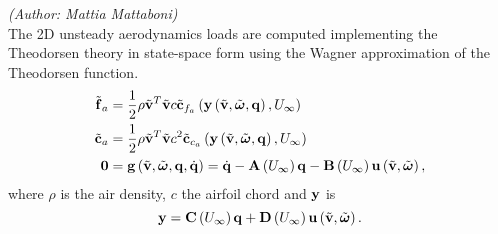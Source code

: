 %
%
%
%
%
% 
%
%
%

\emph{(Author: Mattia Mattaboni)} \\
The 2D unsteady aerodynamics loads are computed implementing
the Theodorsen theory in state-space form using
the Wagner approximation of the Theodorsen function.
\begin{subequations}
\begin{align}
	\tilde{\bm{\mathbf{f}}}_a &= 
		\frac{1}{2} \rho \tilde{\bm{\mathbf{v}}}^T \tilde{\bm{\mathbf{v}}} c
		\tilde{\bm{\mathbf{c}}}_{f_{a}}
		\left(  \bm{\mathbf{y}} 
		\left(  \tilde{\bm{\mathbf{v}}}, \tilde{\bm{\mathbf{\omega}}}, \bm{\mathbf{q}} \right), U_\infty \right)\\
	\tilde{\bm{\mathbf{c}}}_a &= 
		\frac{1}{2} \rho \tilde{\bm{\mathbf{v}}}^T \tilde{\bm{\mathbf{v}}} c^2
		\tilde{\bm{\mathbf{c}}}_{c_{a}} 
		\left(  \bm{\mathbf{y}} 
		\left(  \tilde{\bm{\mathbf{v}}}, \tilde{\bm{\mathbf{\omega}}}, \bm{\mathbf{q}} \right), U_\infty \right)\\
	\bm{\mathbf{0}} &=
		\bm{\mathbf{g}}\left( \tilde{\bm{\mathbf{v}}},\tilde{\bm{\mathbf{\omega}}},\bm{\mathbf{q}}, \dot{\bm{\mathbf{q}}} \right) = 
		\dot{\bm{\mathbf{q}}} - \bm{\mathbf{A}}\left( U_\infty \right) \bm{\mathbf{q}} - \bm{\mathbf{B}}\left( U_\infty \right)
 		\bm{\mathbf{u}}\left( \tilde{\bm{\mathbf{v}}}, \tilde{\bm{\mathbf{\omega}}} \right),
\end{align}
\end{subequations}
where $\rho$ is the air density, $c$ the airfoil chord and $\bm{\mathbf{y}}$ is 
\begin{equation}
	\bm{\mathbf{y}} = \bm{\mathbf{C}}\left( U_\infty \right) \bm{\mathbf{q}} + \bm{\mathbf{D}} \left( U_\infty \right)
 		\bm{\mathbf{u}}\left( \tilde{\bm{\mathbf{v}}}, \tilde{\bm{\mathbf{\omega}}} \right).
\end{equation}

